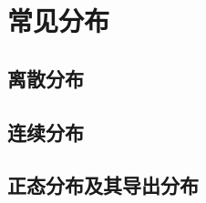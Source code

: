 \documentclass[../main]{subfiles}
\begin{document}
\chapter{常见分布}

\section{离散分布}

\section{连续分布}

\section{正态分布及其导出分布}
\end{document}
